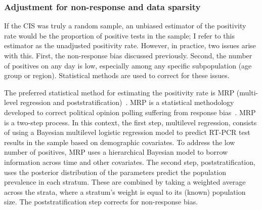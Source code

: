 \documentclass[thesis.tex]{subfiles}
\begin{document}
\subsubsection{Adjustment for non-response and data sparsity} \label{biology-data:sec:MRP}

If the CIS was truly a random sample, an unbiased estimator of the positivity rate would be the proportion of positive tests in the sample; I refer to this estimator as the unadjusted positivity rate.
However, in practice, two issues arise with this.
First, the non-response bias discussed previously.
Second, the number of positives on any day is low, especially among any specific subpopulation (\eg age group or region).
Statistical methods are used to correct for these issues.

The preferred statistical method for estimating the positivity rate is MRP (multi-level regression and poststratification)~\autocite{cisMethodsONS,pouwelsCommunity}.
MRP is a statistical methodology developed to correct political opinion polling suffering from response bias~\autocite{gelmanMRT,gelmanPoststratication,parkMRP}.
MRP is a two-step process.
In this context, the first step, multilevel regression, consists of using a Bayesian multilevel logistic regression model to predict RT-PCR test results in the sample based on demographic covariates.
To address the low number of positives, MRP uses a hierarchical Bayesian model to borrow information across time and other covariates.
The second step, poststratification, uses the posterior distribution of the parameters predict the population prevalence in each stratum.
These are combined by taking a weighted average across the strata, where a stratum's weight is equal to its (known) population size.
The poststratification step corrects for non-response bias.
\end{document}
